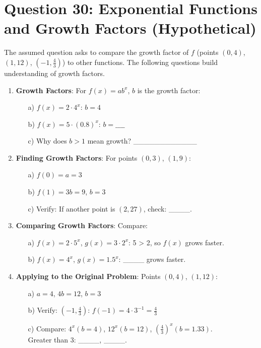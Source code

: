 \documentclass[12pt]{article}
\begin{document}
\section*{Question 30: Exponential Functions and Growth Factors (Hypothetical)}
The assumed question asks to compare the growth factor of \( f \) (points \((0, 4)\), \((1, 12)\), \((-1, \frac{4}{3})\)) to other functions. The following questions build understanding of growth factors.

\begin{enumerate}[label=30.\arabic*]
    \item \textbf{Growth Factors}: For \( f(x) = ab^x \), \( b \) is the growth factor:
    \begin{enumerate}
        \item[a)] \( f(x) = 2 \cdot 4^x \): \( b = 4 \)
        \item[b)] \( f(x) = 5 \cdot (0.8)^x \): \( b = \_\_\_\_ \)
        \item[c)] Why does \( b > 1 \) mean growth? \_\_\_\_\_\_\_\_\_\_\_\_
    \end{enumerate}
    \item \textbf{Finding Growth Factors}: For points \((0, 3)\), \((1, 9)\):
    \begin{enumerate}
        \item[a)] \( f(0) = a = 3 \)
        \item[b)] \( f(1) = 3b = 9 \), \( b = 3 \)
        \item[c)] Verify: If another point is \((2, 27)\), check: \_\_\_\_.
    \end{enumerate}
    \item \textbf{Comparing Growth Factors}: Compare:
    \begin{enumerate}
        \item[a)] \( f(x) = 2 \cdot 5^x \), \( g(x) = 3 \cdot 2^x \): 5 > 2, so \( f(x) \) grows faster.
        \item[b)] \( f(x) = 4^x \), \( g(x) = 1.5^x \): \_\_\_\_ grows faster.
    \end{enumerate}
    \item \textbf{Applying to the Original Problem}: Points \((0, 4)\), \((1, 12)\):
    \begin{enumerate}
        \item[a)] \( a = 4 \), \( 4b = 12 \), \( b = 3 \)
        \item[b)] Verify: \((-1, \frac{4}{3})\): \( f(-1) = 4 \cdot 3^{-1} = \frac{4}{3} \)
        \item[c)] Compare: \( 4^x (b=4) \), \( 12^x (b=12) \), \( \left(\frac{4}{3}\right)^x (b=1.33) \). \\
        Greater than 3: \_\_\_\_, \_\_\_\_.
    \end{enumerate}
\end{enumerate}
\end{document}
